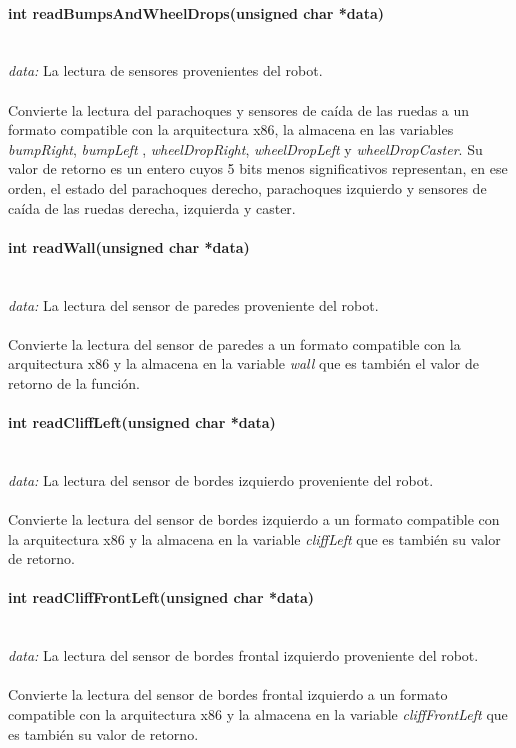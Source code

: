 \documentclass[letterpaper,openright,12pt]{book}
\begin{document}
\paragraph{int readBumpsAndWheelDrops(unsigned char *data)}\mbox{}\\
\emph{data: }La lectura de sensores provenientes del robot.\\\\
Convierte la lectura del  parachoques y sensores de caída de las ruedas a un formato compatible con la arquitectura x86, la almacena en las variables \emph{bumpRight}, \emph{bumpLeft} , \emph{wheelDropRight}, \emph{wheelDropLeft} y \emph{wheelDropCaster}. Su valor de retorno es un entero cuyos 5 bits menos significativos representan, en ese orden, el estado del parachoques derecho, parachoques izquierdo y sensores de caída de las ruedas derecha, izquierda y caster.\\ 

\paragraph{int readWall(unsigned char *data)}\mbox{}\\
\emph{data: }La lectura del sensor de paredes proveniente del robot.\\\\
Convierte la lectura del sensor de paredes a un formato compatible con la arquitectura x86 y la almacena en la variable \emph{wall} que es también el valor de retorno de la función.\\ 

\paragraph{int readCliffLeft(unsigned char *data)}\mbox{}\\
\emph{data: }La lectura del sensor de bordes izquierdo proveniente del robot.\\\\
Convierte la lectura del sensor de bordes izquierdo a un formato compatible con la arquitectura x86 y la almacena en la variable \emph{cliffLeft} que es también su valor de retorno.\\ 

\paragraph{int readCliffFrontLeft(unsigned char *data)}\mbox{}\\
\emph{data: }La lectura del sensor de bordes frontal izquierdo proveniente del robot.\\\\
Convierte la lectura del sensor de bordes frontal izquierdo a un formato compatible con la arquitectura x86 y la almacena en la variable \emph{cliffFrontLeft} que es también su valor de retorno.\\ 
\end{document}
